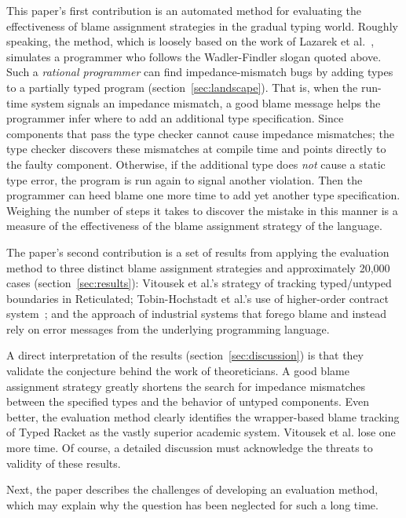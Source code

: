 This paper's first contribution is an automated method for evaluating the
effectiveness of blame assignment strategies in the gradual typing world.
Roughly speaking, the method, which is
loosely based on the work of Lazarek et al.~\cite{lksfd-popl-2020},
simulates a programmer who follows the Wadler-Findler slogan quoted above.
Such a \emph{rational programmer} can find impedance-mismatch
bugs by adding types to a partially typed program (section~\ref{sec:landscape}). That is, when the
run-time system signals an impedance mismatch, a good blame message helps
the programmer infer where to add an additional type specification. Since
components that pass the type checker cannot cause impedance mismatches;
the type checker discovers these mismatches at compile time and points
directly to the faulty component. Otherwise, if the
additional type does {\em not\/} cause a static type error, the program
 is run again to signal another violation. Then the programmer can heed
blame one more time to add yet another type specification. Weighing the number of
steps it takes to discover the mistake in this manner is a measure of the effectiveness
of the blame assignment strategy of the language.

The paper's second contribution is a set of results from applying the evaluation
method to three distinct blame assignment strategies and approximately 20,000
cases (section~\ref{sec:results}): Vitousek et
al.'s strategy of tracking typed/untyped boundaries in Reticulated;
Tobin-Hochstadt et al.'s use of higher-order contract system~\cite{ff-icfp-2002,
mf-toplas-2009}; and the approach of industrial systems that forego blame
and instead rely on error messages from the
underlying programming language.


A direct interpretation of the results (section~\ref{sec:discussion}) is that
they validate the conjecture behind the work of theoreticians. A good blame assignment
strategy
greatly shortens the search for impedance mismatches between the specified types
and the behavior of untyped components. Even better, the evaluation method clearly
identifies the wrapper-based blame tracking of Typed Racket as the vastly superior
academic system. Vitousek et al. lose one more time. Of course, a detailed
discussion must acknowledge the threats to validity of these results.

Next, the paper describes the challenges of developing an evaluation
method, which may explain why the question has been neglected for such
a long time.


